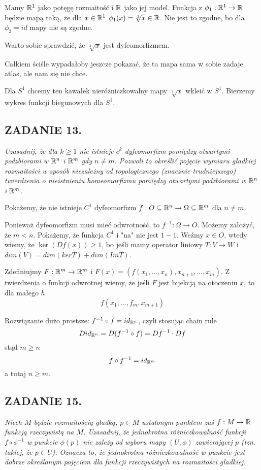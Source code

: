 \documentclass{article}
\begin{document}
Mamy $\mathbb{R}^1$ jako potęgę rozmaitość i $\mathbb{R}$ jako jej model. Funkcja z $\phi_1:\mathbb{R}^1\to\mathbb{R}$ będzie mapą taką, że dla $x\in\mathbb{R}^1$ $\phi_1(x)=\sqrt[3]{x}\in\mathbb{R}$. Nie jest to zgodne, bo dla $\phi_2=id$ mapy nie są zgodne.

Warto sobie sprawdzić, że $\sqrt[3]{x}$ jest dyfeomorfizmem.

Całkiem ściśle wypadałoby jeszcze pokazać, że ta mapa sama w sobie zadaje atlas, ale nam się nie chce.

Dla $S^1$ chcemy ten kawałek nieróżniczkowalny mapy $\sqrt[3]{x}$ wkleić w $S^1$. Bierzemy wykres funkcji biegunowych dla $S^1$.

\subsection*{ZADANIE 13.}
\emph{\color{pink}Uzasadnij, że dla $k\geq1$ nie istnieje $c^k$-dyfeomorfizm pomiędzy otwartymi podzbiorami w $\mathbb{R}^n$ i $\mathbb{R}^m$ gdy $n\neq m$. Pozwoli to określić pojęcie wymiaru gładkiej rozmaitości w sposób niezależny od topologicznego (znacznie trudniejszego) twierdzenia o nieistnieniu homeomorfizmu pomiędzy otwartymi podzbiorami w $\mathbb{R}^n$ i $\mathbb{R}^m$.}

Pokażemy, że nie istnieje $C^1$ dyfeomorfizm $f:O\subseteq\mathbb{R}^n\to\Omega\subseteq\mathbb{R}^m$ dla $n\neq m$.

Ponieważ dyfeomorfizm musi mieć odwrotność, to $f^{-1}:\Omega\to O$. Możemy założyć, że $m<n$. Pokażemy, że funkcja $C^1$ i "na" nie jest $1-1$. Weźmy $x\in O$, wtedy wiemy, że $\ker(Df(x))\geq1$, bo jeśli mamy operator liniowy $T:V\to W$ i $dim(V)=dim(ker T)+dim(Im T)$.

Zdefiniujmy $F:\mathbb{R}^m\to\mathbb{R}^m$ i $F(x)=(f(x_1,...,x_n), x_{n+1},...,x_{m})$. Z twierdzenia o funkcji odwrotnej wiemy, że jeśli $F$ jest bijekcją na otoczeniu $x$, to dla małego $h$
$$f(x_1,...,f_m,x_{m+1})$$

Rozwiązanie dużo prostsze: $f^{-1}\circ f=id_{\mathbb{R}^n}$, czyli stosując chain rule
$$Did_{\mathbb{R}^n}=D(f^{-1}\circ f)=Df^{-1}\cdot Df$$
stąd $m\geq n$
$$f\circ f^{-1}=id_{\mathbb{R}^m}$$
a tutaj $n\geq m$.

\subsection*{ZADANIE 15.}
\emph{\color{yellow}Niech $M$ będzie rozmaitością gładką, $p\in M$ ustalonym punktem zaś $f:M\to\mathbb{R}$ funkcją rzeczywistą na $M$. Uzasadnij, że jednokrotna różniczkowalność funkcji $f\circ\phi^{-1}$ w punkcie $\phi(p)$ nie zależy od wyboru mapy $(U, \phi)$ zawierającej $p$ (tzn. takiej, że $p\in U$). Oznacza to, że jednokrotna różniczkowalność w punkcie jest dobrze określonym pojęciem dla funkcji rzeczywistych na rozmaitości gładkiej.}
\end{document}
